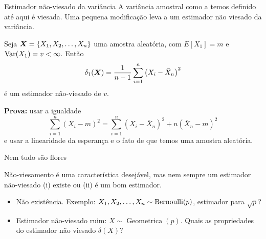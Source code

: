 \begin{frame}{Estimador não-viesado da variância}
A variância amostral como a temos definido até aqui é viesada. 
Uma pequena modificação leva a um estimador não viesado da variância.
\begin{theo}
 Seja $\boldsymbol{X} = \{ X_1, X_2, \ldots, X_n \}$ uma amostra aleatória, com $E[X_1] = m$ e $\operatorname{Var}(X_1) = v < \infty$.
 Então
 \begin{equation*}
  \delta_1(\boldsymbol{X}) = \frac{1}{n-1} \sum_{i=1}^n \left(X_i - \bar{X}_n \right)^2
 \end{equation*}
é um estimador não-viesado de $v$.
\end{theo}
\textbf{Prova:} usar a igualdade
$$ \sum_{i=1}^n \left(X_i - m \right)^2 = \sum_{i=1}^n \left(X_i - \bar{X}_n \right)^2 + n\left(\bar{X}_n - m \right)^2$$
e usar a linearidade da esperança e o fato de que temos uma amostra aleatória.
\end{frame}

\begin{frame}{Nem tudo são flores}

Não-viesamento é uma característica desejável, mas nem sempre um estimador não-viesado (i) existe ou (ii) é um bom estimador.

\begin{itemize}
 \item Não existência.
 Exemplo: $X_1, X_2, \ldots, X_n \sim \operatorname{Bernoulli}(p)$, estimador para $\sqrt{p}$?
 
 \item Estimador não-viesado ruim: $X\sim \operatorname{Geometrica}(p)$.
 Quais as propriedades do estimador não viesado $\delta(X)$?
\end{itemize}
\end{frame}

